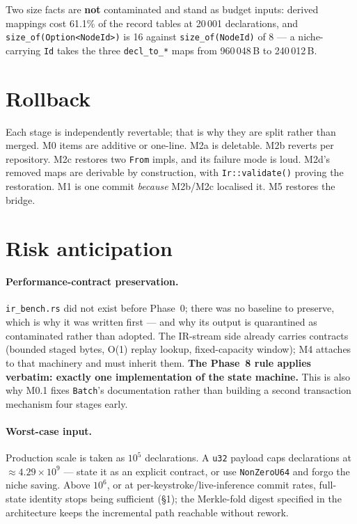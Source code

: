 \documentclass[11pt,a4paper]{article}
\newcommand{\code}[1]{\texttt{#1}}
\begin{document}
Two size facts are \textbf{not} contaminated and stand as budget inputs:
derived mappings cost 61.1\% of the record tables at 20\,001 declarations, and
\code{size\_of(Option<NodeId>)} is 16 against \code{size\_of(NodeId)} of 8 ---
a niche-carrying \code{Id} takes the three \code{decl\_to\_*} maps from
960\,048\,B to 240\,012\,B.

\section{Rollback}

Each stage is independently revertable; that is why they are split rather than
merged. M0 items are additive or one-line. M2a is deletable. M2b reverts per
repository. M2c restores two \code{From} impls, and its failure mode is loud.
M2d's removed maps are derivable by construction, with \code{Ir::validate()}
proving the restoration. M1 is one commit \emph{because} M2b/M2c localised it.
M5 restores the bridge.

\section{Risk anticipation}

\paragraph{Performance-contract preservation.} \code{ir\_bench.rs} did not exist
before Phase~0; there was no baseline to preserve, which is why it was written
first --- and why its output is quarantined as contaminated rather than adopted.
The IR-stream side already carries contracts (bounded staged bytes, O(1) replay
lookup, fixed-capacity window); M4 attaches to that machinery and must inherit
them. \textbf{The Phase~8 rule applies verbatim: exactly one implementation of
the state machine.} This is also why M0.1 fixes \code{Batch}'s documentation
rather than building a second transaction mechanism four stages early.

\paragraph{Worst-case input.} Production scale is taken as $10^5$ declarations.
A \code{u32} payload caps declarations at $\approx 4.29\times10^9$ --- state it
as an explicit contract, or use \code{NonZeroU64} and forgo the niche saving.
Above $10^6$, or at per-keystroke/live-inference commit rates, full-state
identity stops being sufficient (\S1); the Merkle-fold digest specified in the
architecture keeps the incremental path reachable without rework.
\end{document}
